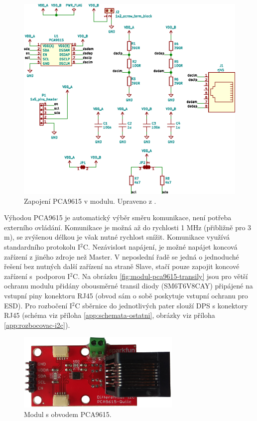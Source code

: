 \begin{figure}[H]
    \centering
    \includegraphics[width=\textwidth]{images/svg/kicad/zapojeni-pca9615-i2c-sbernice.eps}
    \caption[Zapojení PCA9615 v modulu.]{Zapojení PCA9615 v modulu. Upraveno z \cite{pca9615-schema-zapojeni}.}
    \label{fig:zapojeni-pca9615-i2c-sbernice}
\end{figure}

Výhodou PCA9615 je automatický výběr směru komunikace, není potřeba externího ovládání. Komunikace je možná až do rychlosti 1 MHz (přibližně pro 3 m), se zvýšenou délkou je však nutné rychlost snížit. Komunikace využívá standardního protokolu I$^2$C. Nezávislost napájení, je možné napájet koncová zařízení z jiného zdroje než Master. V neposlední řadě se jedná o jednoduché řešení bez nutných další zařízení na straně Slave, stačí pouze zapojit koncové zařízení s~podporou I$^2$C. Na obrázku \ref{fig:modul-pca9615-transily} jsou pro větší ochranu modulu přidány obousměrné transil diody (SM6T6V8CAY) připájené na vstupní piny konektoru RJ45 (obvod sám o sobě poskytuje vstupní ochranu pro ESD). Pro rozbočení I$^2$C sběrnice do jednotlivých pater slouží DPS s konektory RJ45 (schéma viz příloha \ref{app:schemata-ostatni}, obrázky viz příloha \ref{app:rozbocovac-i2c}).

\begin{figure}[H]
    \centering
    \includegraphics[width=0.7\textwidth]{images/krb/modul-pca9615-i2c-sbernice.png}
    \caption[Modul s obvodem PCA9615.]{Modul s obvodem PCA9615.}
    \label{fig:modul-pca9615-i2c-sbernice}
\end{figure}

